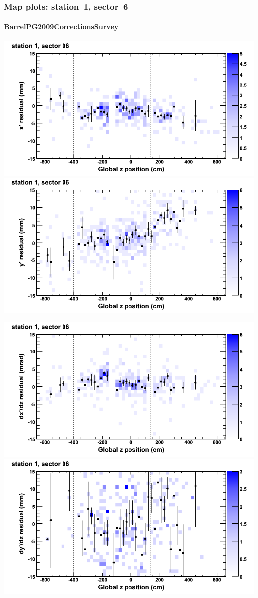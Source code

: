 \documentclass[compress]{beamer}
\begin{document}
\begin{frame}
\frametitle{Map plots: station~1, sector~6}
\framesubtitle{BarrelPG2009CorrectionsSurvey}
\includegraphics[width=0.5\linewidth]{mapplots_01/DTvsz_st1sec06_x.png}
\includegraphics[width=0.5\linewidth]{mapplots_01/DTvsz_st1sec06_y.png}

\includegraphics[width=0.5\linewidth]{mapplots_01/DTvsz_st1sec06_dxdz.png}
\includegraphics[width=0.5\linewidth]{mapplots_01/DTvsz_st1sec06_dydz.png}
\end{frame}
\end{document}
